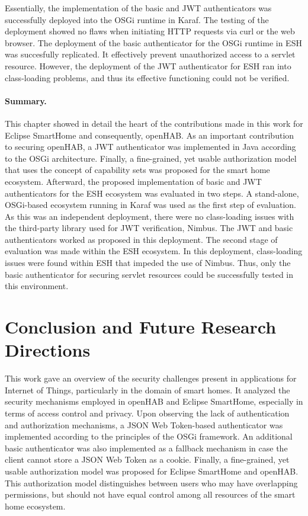 \documentclass[12pt]{article}
\begin{document}
Essentially, the implementation of the basic and JWT authenticators was successfully deployed into the OSGi runtime in Karaf. The testing of the deployment showed no flaws when initiating HTTP requests via curl or the web browser. The deployment of the basic authenticator for the OSGi runtime in ESH was succesfully replicated. It effectively prevent unauthorized access to a servlet resource. However, the deployment of the JWT authenticator for ESH ran into class-loading problems, and thus its effective functioning could not be verified.

\paragraph{Summary.} This chapter showed in detail the heart of the contributions made in this work for Eclipse SmartHome and consequently, openHAB. As an important contribution to securing openHAB, a JWT authenticator was implemented in Java according to the OSGi architecture. Finally, a fine-grained, yet usable authorization model that uses the concept of capability sets was proposed for the smart home ecosystem. Afterward, the proposed implementation of basic and JWT authenticators for the ESH ecosystem was evaluated in two steps. A stand-alone, OSGi-based ecosystem running in Karaf was used as the first step of evaluation. As this was an independent deployment, there were no class-loading issues with the third-party library used for JWT verification, Nimbus. The JWT and basic authenticators worked as proposed in this deployment. The second stage of evaluation was made within the ESH ecosystem. In this deployment, class-loading issues were found within ESH that impeded the use of Nimbus. Thus, only the basic authenticator for securing servlet resources could be successfully tested in this environment.

\newpage
\section{Conclusion and Future Research Directions}
\label{sec:conclusion}
This work gave an overview of the security challenges present in applications for Internet of Things, particularly in the domain of smart homes. It analyzed the security mechanisms employed in openHAB and Eclipse SmartHome, especially in terms of access control and privacy. Upon observing the lack of authentication and authorization mechanisms, a JSON Web Token-based authenticator was implemented according to the principles of the OSGi framework. An additional basic authenticator was also implemented as a fallback mechanism in case the client cannot store a JSON Web Token as a cookie. Finally, a fine-grained, yet usable authorization model was proposed for Eclipse SmartHome and openHAB. This authorization model distinguishes between users who may have overlapping permissions, but should not have equal control among all resources of the smart home ecosystem.
\end{document}
